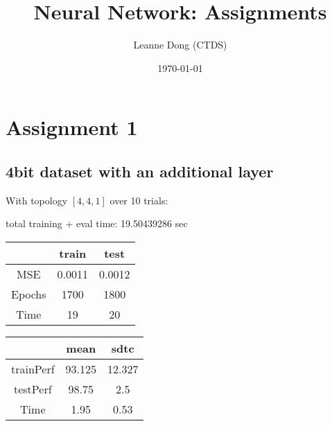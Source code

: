 \documentclass[11pt, oneside, reqno]{amsart}
\title{Neural Network: Assignments}
\author{Leanne Dong (CTDS)
}
\date{\today}
\numberwithin{equation}{section}
\theoremstyle{plain}%
\theoremstyle{definition}
\theoremstyle{remark}
\begin{document}
	\maketitle
\section{Assignment 1}
\subsection{4bit dataset with an additional layer}

With topology $[4,4,1]$ over 10 trials:

total training $+$ eval time: 19.50439286 sec
\begin{table}[ht]
\begin{center}
\begin{tabular}{ |c|c|c|} 
\hline
 & train & test  \\ 
 \hline\hline
MSE & 0.0011 & 0.0012  \\ 
Epochs & 1700 & 1800  \\ 
 Time & 19 & 20\\
 \hline
\end{tabular}
\end{center}
\end{table}

\begin{table}[ht]
\begin{center}
\begin{tabular}{ |c|c|c|} 
\hline
 & mean & sdtc  \\ 
 \hline\hline
trainPerf & 93.125 & 12.327  \\ 
testPerf & 98.75 & 2.5  \\ 
 Time & 1.95 & 0.53\\
 \hline
\end{tabular}
\end{center}
\end{table}  
\end{document}
